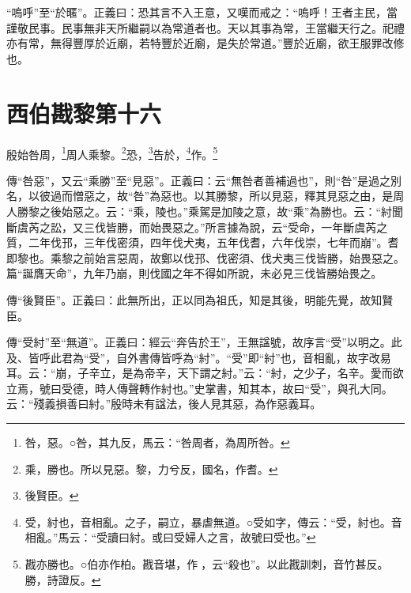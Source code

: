 {\noindent\shu{}\fzkt “嗚呼”至“於暱”。正義曰：恐其言不入王意，又嘆而戒之：“嗚呼！王者主民，當謹敬民事。民事無非天所繼嗣以為常道者也。天以其事為常，王當繼天行之。祀禮亦有常，無得豐厚於近廟，若特豐於近廟，是失於常道。”豐於近廟，欲王服罪改修也。 \par}

\section{西伯戡黎第十六}


殷始咎周，\footnote{咎，惡。○咎，其九反，馬云：“咎周者，為周所咎。}周人乘黎。\footnote{乘，勝也。所以見惡。黎，力兮反，國名，作耆。}恐，\footnote{後賢臣。}告於，\footnote{受，紂也，音相亂。之子，嗣立，暴虐無道。○受如字，傳云：“受，紂也。音相亂。”馬云：“受讀曰紂。或曰受婦人之言，故號曰受也。”}作。\footnote{戡亦勝也。○伯亦作柏。戡音堪，作𢦟，云“殺也”。以此戡訓刺，音竹甚反。勝，詩證反。}

{\noindent\zhuan{}\fzbyks 傳“咎惡”，又云“乘勝”至“見惡”。正義曰：云“無咎者善補過也”，則“咎”是過之別名，以彼過而憎惡之，故“咎”為惡也。以其勝黎，所以見惡，釋其見惡之由，是周人勝黎之後始惡之。云：“乘，陵也。”乘駕是加陵之意，故“乘”為勝也。云：“紂聞斷虞芮之訟，又三伐皆勝，而始畏惡之。”所言據為說，云“受命，一年斷虞芮之質，二年伐邘，三年伐密須，四年伐犬夷，五年伐耆，六年伐崇，七年而崩”。耆即黎也。乘黎之前始言惡周，故鄭以伐邘、伐密須、伐犬夷三伐皆勝，始畏惡之。篇“誕膺天命”，九年乃崩，則伐國之年不得如所說，未必見三伐皆勝始畏之。 \par}

{\noindent\zhuan{}\fzbyks 傳“後賢臣”。正義曰：此無所出，正以同為祖氏，知是其後，明能先覺，故知賢臣。 \par}

{\noindent\zhuan{}\fzbyks 傳“受紂”至“無道”。正義曰：經云“奔告於王”，王無諡號，故序言“受”以明之。此及、皆呼此君為“受”，自外書傳皆呼為“紂”。“受”即“紂”也，音相亂，故字改易耳。云：“崩，子辛立，是為帝辛，天下謂之紂。”云：“紂，之少子，名辛。愛而欲立焉，號曰受德，時人傳聲轉作紂也。”史掌書，知其本，故曰“受”，與孔大同。云：“殘義損善曰紂。”殷時未有諡法，後人見其惡，為作惡義耳。 \par}


